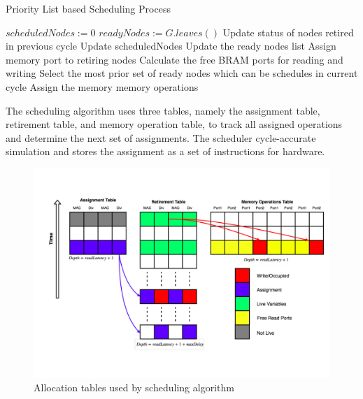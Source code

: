 \begin{algorithm}[H]
    \caption{Priority List based Scheduling Process}
        \label{algo:sch:sch}
    \begin{algorithmic}[1]
        \Statex
        \State $scheduledNodes := 0$
        \State $readyNodes := G.leaves()$
            \State Update status of nodes retired in previous cycle
            \State Update scheduledNodes
            \State Update the ready nodes list
            \State Assign memory port to retiring nodes
            \State Calculate the free BRAM ports for reading and writing
            \State Select the most prior set of ready nodes which can be schedules in current cycle
            \State Assign the memory memory operations
        \EndWhile
    \end{algorithmic}
\end{algorithm}
The scheduling algorithm uses three tables, namely the assignment table, retirement table, and memory operation table, to track all assigned operations and determine the next set of assignments. The scheduler cycle-accurate simulation and stores the assignment as a set of instructions for hardware.
\begin{figure}[H]
    \centering
    \includegraphics[width = \linewidth]{./Scheduler/schedulartable.pdf}
    \caption{Allocation tables used by scheduling algorithm}
    \label{fig:sch:tableBlank}
\end{figure}

\pagebreak

